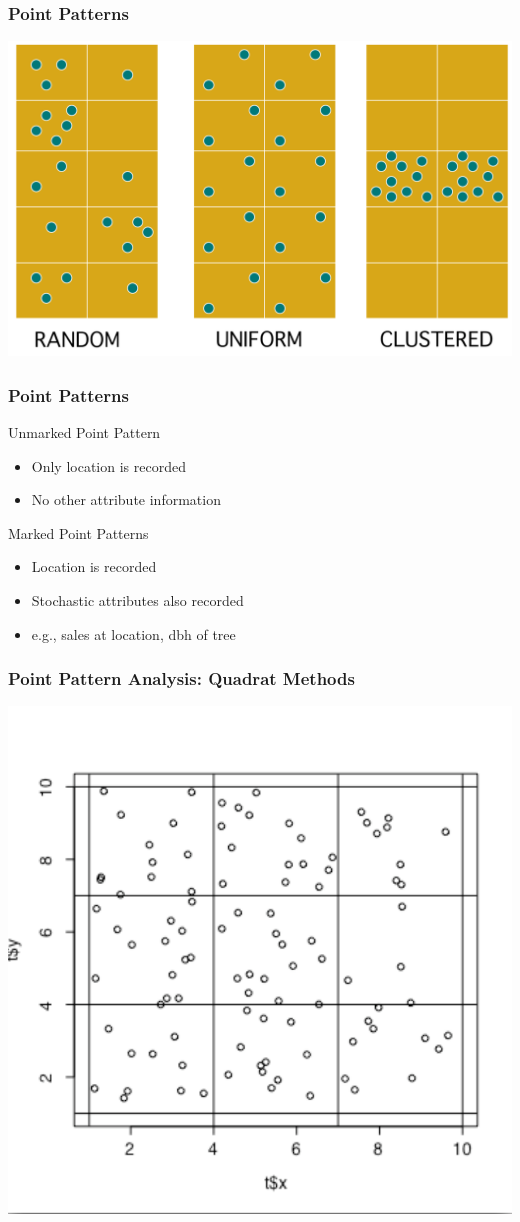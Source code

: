\documentclass[nototal,handout]{beamer}
\begin{document}
    \begin{frame}
      \frametitle{Point Patterns}
      \begin{center}
	\includegraphics[width=.65\linewidth]{pointtypes.pdf}
      \end{center}
    \end{frame}
    \begin{frame}
      \frametitle{Point Patterns}
      \begin{block}{Unmarked Point Pattern}
	\begin{itemize}
	  \item Only location is recorded
	  \item No other attribute information
	\end{itemize}
      \end{block}
      \begin{block}{Marked Point Patterns}
	\begin{itemize}
	  \item Location is recorded
	  \item Stochastic attributes also recorded
	  \item e.g., sales at location, dbh of tree
	\end{itemize}
      \end{block}
    \end{frame}

    \begin{frame}
       \frametitle{Point Pattern Analysis: Quadrat Methods}
       \begin{center}
	 \includegraphics[width=.65\linewidth]{plotquad.pdf}
       \end{center}
     \end{frame}
\end{document}
